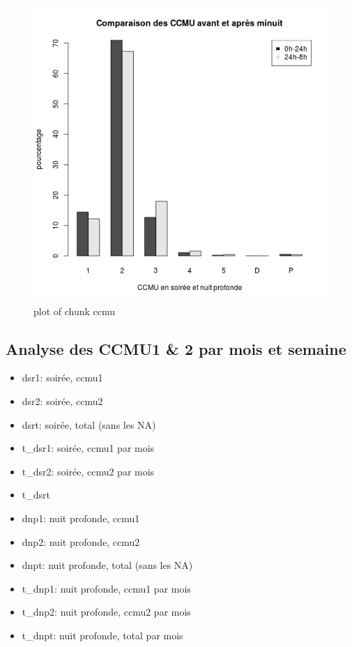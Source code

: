 \begin{figure}[htbp]
\centering
\includegraphics{figure/ccmu4.png}
\caption{plot of chunk ccmu}
\end{figure}

\subsection{Analyse des CCMU1 \& 2 par mois et semaine}

\begin{itemize}
\item
  dsr1: soirée, ccmu1
\item
  dsr2: soirée, ccmu2
\item
  dsrt: soirée, total (sans les NA)
\item
  t\_dsr1: soirée, ccmu1 par mois
\item
  t\_dsr2: soirée, ccmu2 par mois
\item
  t\_dsrt
\item
  dnp1: nuit profonde, ccmu1
\item
  dnp2: nuit profonde, ccmu2
\item
  dnpt: nuit profonde, total (sans les NA)
\item
  t\_dnp1: nuit profonde, ccmu1 par mois
\item
  t\_dnp2: nuit profonde, ccmu2 par mois
\item
  t\_dnpt: nuit profonde, total par mois
\end{itemize}

